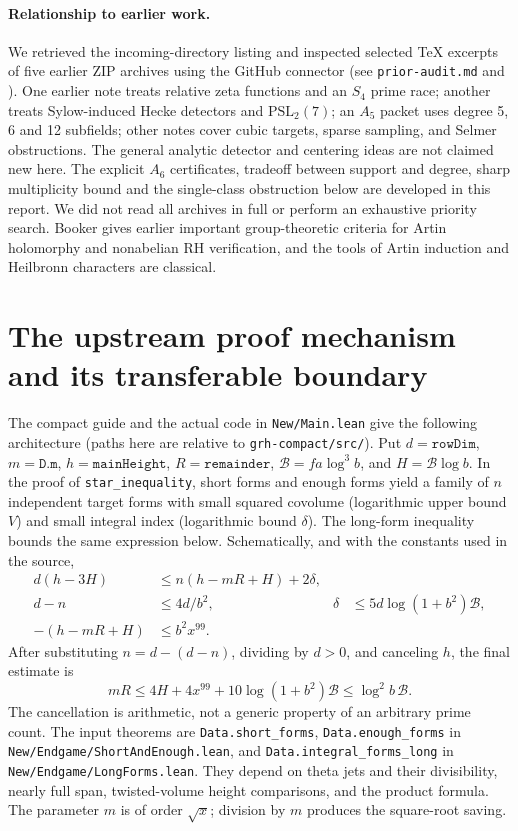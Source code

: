 \documentclass[11pt,letterpaper]{article}
\theoremstyle{remark}\newtheorem{remark}[theorem]{Remark}
\newcommand{\code}[1]{\nolinkurl{#1}}
\begin{document}
\paragraph{Relationship to earlier work.}
We retrieved the incoming-directory listing and inspected selected TeX excerpts of five earlier ZIP archives using the GitHub connector (see \code{prior-audit.md} and \cite{prior}). One earlier note treats relative zeta functions and an $S_4$ prime race; another treats Sylow-induced Hecke detectors and $\mathrm{PSL}_2(7)$; an $A_5$ packet uses degree 5, 6 and 12 subfields; other notes cover cubic targets, sparse sampling, and Selmer obstructions. The general analytic detector and centering ideas are not claimed new here. The explicit $A_6$ certificates, tradeoff between support and degree, sharp multiplicity bound and the single-class obstruction below are developed in this report. We did not read all archives in full or perform an exhaustive priority search. Booker \cite{booker} gives earlier important group-theoretic criteria for Artin holomorphy and nonabelian RH verification, and the tools of Artin induction and Heilbronn characters are classical.

\section{The upstream proof mechanism and its transferable boundary}
The compact guide and the actual code in \code{New/Main.lean} give the following architecture (paths here are relative to \code{grh-compact/src/}). Put $d=\texttt{rowDim}$, $m=\texttt{D.m}$, $h=\texttt{mainHeight}$, $R=\texttt{remainder}$, $\mathcal B=fa\log^3 b$, and $H=\mathcal B\log b$. In the proof of \code{star_inequality}, short forms and enough forms yield a family of $n$ independent target forms with small squared covolume (logarithmic upper bound $V$) and small integral index (logarithmic bound $\delta$). The long-form inequality bounds the same expression below. Schematically, and with the constants used in the source,
\begin{align*}
 d(h-3H)&\le n(h-mR+H)+2\delta,\\
 d-n&\le 4d/b^2, & \delta&\le 5d\log(1+b^2)\mathcal B,\\
 -(h-mR+H)&\le b^2x^{99}.&&
\end{align*}
After substituting $n=d-(d-n)$, dividing by $d>0$, and canceling $h$, the final estimate is
\[
 mR\le 4H+4x^{99}+10\log(1+b^2)\mathcal B
 \le \log^2 b\,\mathcal B.
\]
The cancellation is arithmetic, not a generic property of an arbitrary prime count. The input theorems are \code{Data.short_forms}, \code{Data.enough_forms} in \code{New/Endgame/ShortAndEnough.lean}, and \code{Data.integral_forms_long} in \code{New/Endgame/LongForms.lean}. They depend on theta jets and their divisibility, nearly full span, twisted-volume height comparisons, and the product formula. The parameter $m$ is of order $\sqrt x$; division by $m$ produces the square-root saving.
\end{document}
